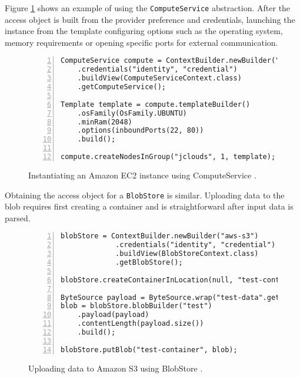 Figure \ref{ComputeService} shows an example of using the \verb|ComputeService| abstraction. After the access object is built from the provider preference and credentials, launching the instance from the template configuring options such as the operating system, memory requirements or opening specific ports for external communication.

\begin{figure}[h]
	\centering
	\begin{minipage}{11.5cm}
		\begin{Verbatim}[fontsize=\small, numbers=left, frame=single]
ComputeService compute = ContextBuilder.newBuilder("aws-ec2")
    .credentials("identity", "credential")
    .buildView(ComputeServiceContext.class)
    .getComputeService();

Template template = compute.templateBuilder()
    .osFamily(OsFamily.UBUNTU)
    .minRam(2048)
    .options(inboundPorts(22, 80))
    .build();

compute.createNodesInGroup("jclouds", 1, template);
		\end{Verbatim}
	\end{minipage}
	\caption{Instantiating an Amazon EC2 instance using ComputeService \cite{jclouds}.}
	\label{ComputeService}
\end{figure}

Obtaining the access object for a \verb|BlobStore| is similar. Uploading data to the blob requires first creating a container and is straightforward after input data is parsed.

\begin{figure}[h]
	\centering
	\begin{minipage}{12.5cm}
		\begin{Verbatim}[fontsize=\small, numbers=left, frame=single]
blobStore = ContextBuilder.newBuilder("aws-s3")
             .credentials("identity", "credential")
             .buildView(BlobStoreContext.class)
             .getBlobStore();

blobStore.createContainerInLocation(null, "test-container");

ByteSource payload = ByteSource.wrap("test-data".getBytes(UTF_8));
blob = blobStore.blobBuilder("test")
    .payload(payload)
    .contentLength(payload.size())
    .build();

blobStore.putBlob("test-container", blob);
		\end{Verbatim}
	\end{minipage}
	\caption{Uploading data to Amazon S3 using BlobStore \cite{jclouds}.}
	\label{BlobStore}
\end{figure}

